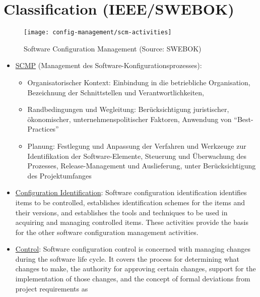 \section{Classification (IEEE/SWEBOK)}
\begin{figure}[H]
\centering
\texttt{[image: config-management/scm-activities]}
\caption{Software Configuration Management (Source: SWEBOK)}
\end{figure}
\begin{itemize}
\item \underline{SCMP}
   (Management des Software-Konfigurationsprozesses):
  \begin{itemize}
  \item Organisatorischer Kontext: Einbindung in die betriebliche
  Organisation, Bezeichnung der Schnittstellen und Verantwortlichkeiten,
\item Randbedingungen und Wegleitung: Berücksichtigung juristischer,
  ökonomischer, unternehmenspolitischer Faktoren, Anwendung von
  ``Best-Practices''
\item Planung: Festlegung und Anpassung der Verfahren und Werkzeuge zur
  Identifikation der Software-Elemente, Steuerung und Überwachung des
  Prozesses, Release-Management und Auslieferung, unter Berücksichtigung des
  Projektumfanges
  \end{itemize}
\item \underline{Configuration Identification}:
  Software configuration identification identifies items to be
  controlled, establishes identification schemes for the items and
  their versions, and establishes the tools and techniques to be
  used in acquiring and managing controlled items. These activities
  provide the basis for the other software configuration management
  activities.
\item \underline{Control}:
  Software configuration control is concerned with managing changes
  during the software life cycle. It covers the process for
  determining what changes to make, the authority for approving certain
  changes, support for the implementation of those changes,
  and the concept of formal deviations from project requirements as

\end{itemize}
